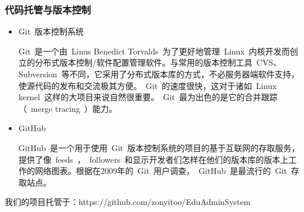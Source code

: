 \subsubsection{代码托管与版本控制}
\begin{itemize}
  \item Git~版本控制系统
  
  \CJKindent Git~是一个由~Linus Benedict Torvalds~为了更好地管理~Linux~内核开发而创立的分布式版本控制/软件配置管理软件。与常用的版本控制工具~CVS、Subversion~等不同，它采用了分布式版本库的方式，不必服务器端软件支持，使源代码的发布和交流极其方便。~Git~的速度很快，这对于诸如~Linux kernel~这样的大项目来说自然很重要。~Git~最为出色的是它的合并跟踪（~merge tracing~）能力。
  
  \item GitHub
  
  \CJKindent GitHub~是一个用于使用~Git~版本控制系统的项目的基于互联网的存取服务，提供了像~feeds~，~followers~和显示开发者们怎样在他们的版本库的版本上工作的网络图表。根据在2009年的~Git~用户调查，~GitHub~是最流行的~Git~存取站点。
\end{itemize}

我们的项目托管于：https://github.com/zonyitoo/EduAdminSystem
